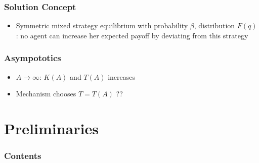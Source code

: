 \documentclass{beamer}
\begin{document}
\begin{frame}
\frametitle{Solution Concept}
\begin{itemize}
	\item Symmetric mixed strategy equilibrium with probability $\beta$, distribution $F(q)$: no agent can increase her expected payoff by deviating from this strategy
\end{itemize}
\end{frame}

\begin{frame}
\frametitle{Asympototics}
\begin{itemize}
	\item $A\to \infty$: $K(A)$ and $T(A)$ increases
	\item Mechanism chooses $T=T(A)$ ??
\end{itemize}
\end{frame}

\section{Preliminaries}
\begin{frame}
\frametitle{}
\end{frame}


\begin{frame}[plain]
\frametitle{Contents}
\tableofcontents[hideallsubsections]
\end{frame}
\end{document}
